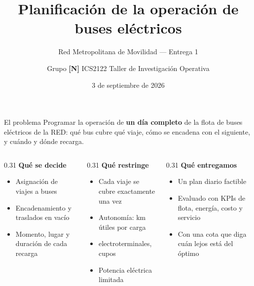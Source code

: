 \documentclass[aspectratio=169,11pt]{beamer}
\title{Planificación de la operación de buses eléctricos}
\subtitle{Red Metropolitana de Movilidad — Entrega 1}
\author{Grupo \textbf{[N]} \quad\textbar\quad ICS2122 Taller de Investigación Operativa}
\date{3 de septiembre de 2026}
\begin{document}
\begin{frame}[plain]
  \titlepage
\end{frame}

\begin{frame}{El problema}
  \small
  Programar la operación de \textbf{un día completo} de la flota de buses
  eléctricos de la RED: qué bus cubre qué viaje, cómo se encadena con el
  siguiente, y cuándo y dónde recarga.

  \vspace{6pt}
  \begin{columns}[t]
    \begin{column}{0.31\textwidth}
      {\color{ink}\bfseries Qué se decide}
      \begin{itemize}\footnotesize
        \item Asignación de viajes a buses
        \item Encadenamiento y traslados en vacío
        \item Momento, lugar y duración de cada recarga
      \end{itemize}
    \end{column}
    \begin{column}{0.31\textwidth}
      {\color{ink}\bfseries Qué restringe}
      \begin{itemize}\footnotesize
        \item Cada viaje se cubre exactamente una vez
        \item Autonomía: \autonomiaUtil{} km útiles por carga
        \item \numElectroterminales{} electroterminales, \cuposTotales{} cupos
        \item Potencia eléctrica limitada
      \end{itemize}
    \end{column}
    \begin{column}{0.31\textwidth}
      {\color{ink}\bfseries Qué entregamos}
      \begin{itemize}\footnotesize
        \item Un plan diario factible
        \item Evaluado con KPIs de flota, energía, costo y servicio
        \item Con una cota que diga cuán lejos está del óptimo
      \end{itemize}
    \end{column}
  \end{columns}

\end{frame}
\end{document}
